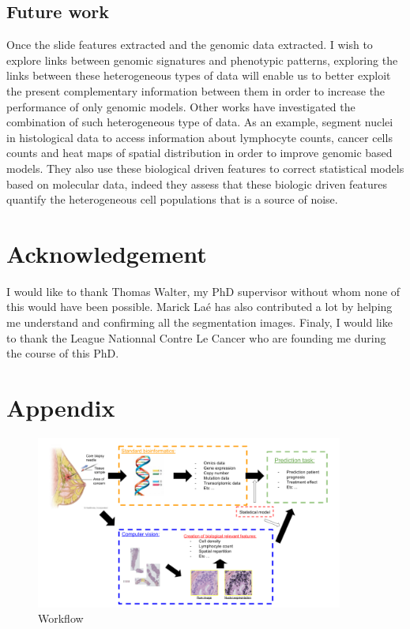 \documentclass[a4paper,10pt,twocolumn]{article}
\begin{document}
\subsection{Future work}

Once the slide features extracted and the genomic data extracted. I wish to explore
links between genomic signatures and phenotypic patterns, exploring
the links between these heterogeneous types of data will enable us to
better exploit the present complementary information between them in
order to increase the performance of only genomic models. Other works
have investigated the combination of such heterogeneous type of
data. As an example, \citet{yuan2012quantitative} segment nuclei in  
 histological data to access information about lymphocyte counts,
 cancer cells counts and heat maps of spatial distribution in order to
 improve genomic based models.  They also use these biological  driven
 features to correct statistical models based on molecular data,
 indeed they assess that  these biologic driven features quantify the
 heterogeneous cell populations that is a source of  noise. 

\section*{Acknowledgement}
I would like to thank Thomas Walter, my PhD supervisor without 
whom none of this would have been possible. Marick Laé has also 
contributed a lot by helping me understand and confirming all the 
segmentation images. Finaly, I would like to thank the League 
Nationnal Contre Le Cancer who are founding me during the 
course of this PhD.

 \newpage
 



%
{\footnotesize
}
\newpage


\onecolumn

\section*{Appendix}

 \begin{figure}[!ht]
\centering
\includegraphics[width=0.9\textwidth]{Whatido.png}
\caption{Workflow}
\label{workflow1}
\end{figure}
\end{document}
